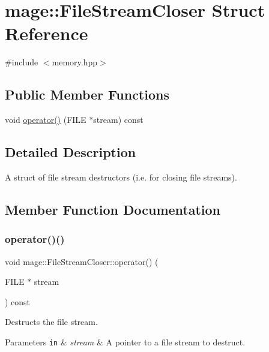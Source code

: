 \hypertarget{structmage_1_1_file_stream_closer}{}\section{mage\+:\+:File\+Stream\+Closer Struct Reference}
\label{structmage_1_1_file_stream_closer}


{\ttfamily \#include $<$memory.\+hpp$>$}

\subsection*{Public Member Functions}
\begin{DoxyCompactItemize}
\item 
void \hyperlink{structmage_1_1_file_stream_closer_a418fb8ba91d00f901b6c0237eadbb57f}{operator()} (F\+I\+LE $\ast$stream) const
\end{DoxyCompactItemize}


\subsection{Detailed Description}
A struct of file stream destructors (i.\+e. for closing file streams). 

\subsection{Member Function Documentation}
\hypertarget{structmage_1_1_file_stream_closer_a418fb8ba91d00f901b6c0237eadbb57f}{}\label{structmage_1_1_file_stream_closer_a418fb8ba91d00f901b6c0237eadbb57f} 
\subsubsection{\texorpdfstring{operator()()}{operator()()}}
{\footnotesize\ttfamily void mage\+::\+File\+Stream\+Closer\+::operator() (\begin{DoxyParamCaption}\item[{F\+I\+LE $\ast$}]{stream }\end{DoxyParamCaption}) const}

Destructs the file stream.


\begin{DoxyParams}[1]{Parameters}
\mbox{\tt in}  & {\em stream} & A pointer to a file stream to destruct. \\
\hline
\end{DoxyParams}
